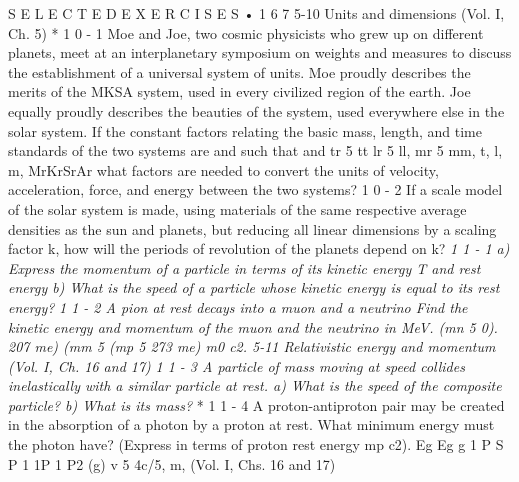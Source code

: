 \documentclass[10pt,oneside]{article}
\begin{document}
S E L E C T E D  E X E R C I S E S • 1 6 7 5-10 Units and dimensions (Vol. I, Ch. 5) * 1 0 - 1 Moe and Joe, two cosmic physicists who grew up on different planets, meet at an interplanetary symposium on weights and measures to discuss the establishment of a universal system of units. Moe proudly describes the merits of the MKSA system, used in every civilized region of the earth. Joe equally proudly describes the beauties of the system, used everywhere else in the solar system. If the constant factors relating the basic mass, length, and time standards of the two systems are and such that and tr 5 tt lr 5 ll, mr 5 mm, t, l, m, MrKrSrAr what factors are needed to convert the units of velocity, acceleration, force, and energy between the two systems? \emph{ } 1 0 - 2 If a scale model of the solar system is made, using materials of the same respective average densities as the sun and planets, but reducing all linear dimensions by a scaling factor k, how will the periods of revolution of the planets depend on k? \emph{ 1 1 - 1 a) Express the momentum of a particle in terms of its kinetic energy T and rest energy b) What is the speed of a particle whose kinetic energy is equal to its rest energy? } \emph{ 1 1 - 2 A pion at rest decays into a muon and a neutrino Find the kinetic energy and momentum of the muon and the neutrino in MeV. (mn 5 0). 207 me) (mm 5 (mp 5 273 me) m0 c2. 5-11 Relativistic energy and momentum (Vol. I, Ch. 16 and 17) } \emph{ 1 1 - 3 A particle of mass moving at speed collides inelastically with a similar particle at rest. a) What is the speed of the composite particle? b) What is its mass? } * 1 1 - 4 A proton-antiproton pair may be created in the absorption of a photon by a proton at rest. What minimum energy must the photon have? (Express in terms of proton rest energy mp c2). Eg Eg g 1 P S P 1 1P 1 P2 (g) v 5 4c/5, m, (Vol. I, Chs. 16 and 17)\par
\end{document}
